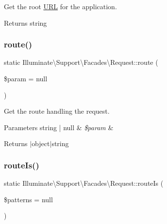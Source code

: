 Get the root \mbox{\hyperlink{class_illuminate_1_1_support_1_1_facades_1_1_u_r_l}{U\+RL}} for the application.

\begin{DoxyReturn}{Returns}
string 
\end{DoxyReturn}
\mbox{\label{class_illuminate_1_1_support_1_1_facades_1_1_request_abf913e2bc3550d8804377ed6aed93be4}} 
\subsubsection{\texorpdfstring{route()}{route()}}
{\footnotesize\ttfamily static Illuminate\textbackslash{}\+Support\textbackslash{}\+Facades\textbackslash{}\+Request\+::route (\begin{DoxyParamCaption}\item[{}]{\$param = {\ttfamily null} }\end{DoxyParamCaption})\hspace{0.3cm}{\ttfamily [static]}}

Get the route handling the request.


\begin{DoxyParams}[1]{Parameters}
string | null & {\em \$param} & \\
\hline
\end{DoxyParams}
\begin{DoxyReturn}{Returns}
$\vert$object$\vert$string 
\end{DoxyReturn}
\mbox{\label{class_illuminate_1_1_support_1_1_facades_1_1_request_a3d91ee547365fbae69326d4331b12457}} 
\subsubsection{\texorpdfstring{route\+Is()}{routeIs()}}
{\footnotesize\ttfamily static Illuminate\textbackslash{}\+Support\textbackslash{}\+Facades\textbackslash{}\+Request\+::route\+Is (\begin{DoxyParamCaption}\item[{}]{\$patterns = {\ttfamily null} }\end{DoxyParamCaption})\hspace{0.3cm}{\ttfamily [static]}}

